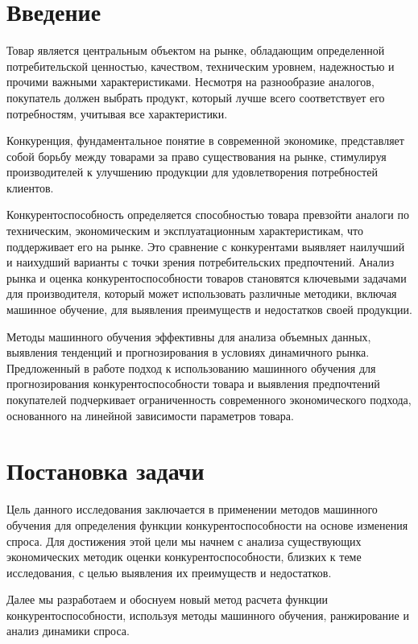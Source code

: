 \documentclass[14pt, a4paper]{extarticle}
\begin{document}
  \pagestyle{plain}
  \setcounter{page}{3}

  \section{Введение}
  Товар является центральным объектом на рынке, обладающим определенной
  потребительской ценностью, качеством, техническим уровнем, надежностью и
  прочими важными характеристиками. Несмотря на разнообразие аналогов,
  покупатель должен выбрать продукт, который лучше всего соответствует
  его потребностям, учитывая все характеристики. 
  
  Конкуренция,
  фундаментальное понятие в современной экономике, представляет собой
  борьбу между товарами за право существования на рынке, стимулируя
  производителей к улучшению продукции для удовлетворения потребностей
  клиентов.
  
  Конкурентоспособность определяется способностью товара превзойти
  аналоги по техническим, экономическим и эксплуатационным
  характеристикам, что поддерживает его на рынке. Это сравнение с
  конкурентами выявляет наилучший и наихудший варианты с точки зрения
  потребительских предпочтений. Анализ рынка и оценка
  конкурентоспособности товаров становятся ключевыми задачами для
  производителя, который может использовать различные методики, включая
  машинное обучение, для выявления преимуществ и недостатков своей
  продукции.
  
  Методы машинного обучения эффективны для анализа объемных данных,
  выявления тенденций и прогнозирования в условиях динамичного рынка.
  Предложенный в работе подход к использованию машинного обучения для
  прогнозирования конкурентоспособности товара и выявления предпочтений
  покупателей подчеркивает ограниченность современного экономического
  подхода, основанного на линейной зависимости параметров товара.
  \newpage

  \section{Постановка задачи}
  Цель данного исследования заключается в применении методов машинного обучения для определения функции конкурентоспособности на основе изменения спроса. Для достижения этой цели мы начнем с анализа существующих экономических методик оценки конкурентоспособности, близких к теме исследования, с целью выявления их преимуществ и недостатков.

  Далее мы разработаем и обоснуем новый метод расчета функции конкурентоспособности, используя методы машинного обучения, ранжирование и анализ динамики спроса.
  
\end{document}
